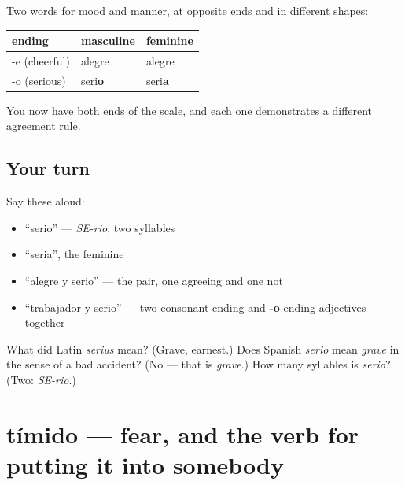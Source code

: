 \begin{grammarlens}[title={What you've built}]
Two words for mood and manner, at opposite ends and in different shapes:

\noindent
\begin{tabularx}{\linewidth}{@{}>{\raggedright\arraybackslash}X>{\raggedright\arraybackslash}X>{\raggedright\arraybackslash}X@{}}
\toprule
\textbf{ending} & \textbf{masculine} & \textbf{feminine} \\
\midrule
-e (cheerful) & alegre & alegre \\
-o (serious) & seri\textbf{o} & seri\textbf{a} \\
\bottomrule
\end{tabularx}

You now have both ends of the scale, and each one demonstrates a different agreement rule.
\end{grammarlens}

\subsection*{Your turn}
Say these aloud:

\begin{itemize}
\raggedright
  \item \textquotedblleft{}serio\textquotedblright{} — \emph{SE-rio}, two syllables
  \item \textquotedblleft{}seria\textquotedblright{}, the feminine
  \item \textquotedblleft{}alegre y serio\textquotedblright{} — the pair, one agreeing and one not
  \item \textquotedblleft{}trabajador y serio\textquotedblright{} — two consonant-ending and \textbf{-o}-ending adjectives together
\end{itemize}

\begin{tcolorbox}[breakable,colback=teal!4,colframe=teal!35!black,title={Before you move on}]
What did Latin \emph{serius} mean? (Grave, earnest.) Does Spanish \emph{serio} mean \emph{grave} in the sense of a bad accident? (No — that is \emph{grave}.) How many syllables is \emph{serio}? (Two: \emph{SE-rio}.)
\end{tcolorbox}
\section[tímido]{tímido — fear, and the verb for putting it into somebody}

\label{lesson:ES-C423-timido}



